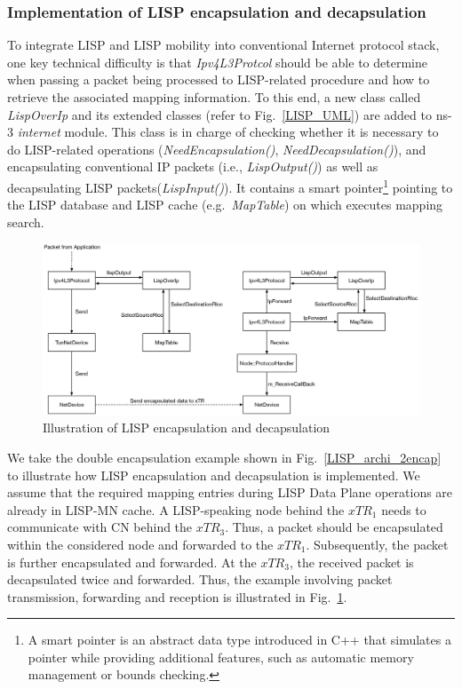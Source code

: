 \subsubsection{Implementation of LISP encapsulation and decapsulation}
To integrate LISP and LISP mobility into conventional Internet protocol stack, one key technical difficulty is that \emph{Ipv4L3Protcol} should be able to determine when passing a packet being processed to LISP-related procedure and how to retrieve the associated mapping information. To this end, a new class called \emph{LispOverIp} and its extended classes (refer to Fig.~\ref{LISP_UML}) are added to ns-3 \emph{internet} module. This class is in charge of checking whether it is necessary to do LISP-related operations (\emph{NeedEncapsulation()}, \emph{NeedDecapsulation()}), and encapsulating conventional IP packets (i.e., \emph{LispOutput()}) as well as decapsulating LISP packets(\emph{LispInput()}). It contains a smart pointer\footnote{A smart pointer is an abstract data type introduced in C++ that simulates a pointer while providing additional features, such as automatic memory management or bounds checking.} pointing to the LISP database and LISP cache (e.g.~\emph{MapTable}) on which executes mapping search.
\begin{figure}[!t]
	\centering
	\includegraphics[width=\textwidth]{Pics/ns3_lisp_data_plane.eps}
	\caption{Illustration of LISP encapsulation and decapsulation} 
	\label{fig:ns3-lisp-data-plane}
\end{figure}

We take the double encapsulation example shown in Fig.~\ref{LISP_archi_2encap} to illustrate how LISP encapsulation and decapsulation is implemented. We assume that the required mapping entries during LISP Data Plane operations are already in LISP-MN cache. A LISP-speaking node behind the $xTR_1$ needs to communicate with CN behind the $xTR_3$. Thus, a packet should be encapsulated within the considered node and forwarded to the $xTR_1$. Subsequently, the packet is further encapsulated and forwarded. At the $xTR_3$, %
the received packet is decapsulated twice and forwarded. Thus, the example involving packet transmission, forwarding and reception is illustrated in Fig.~\ref{fig:ns3-lisp-data-plane}. 

